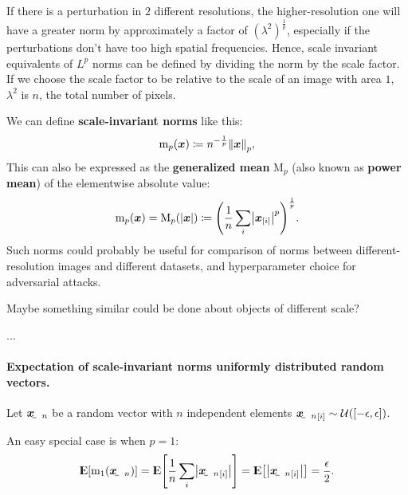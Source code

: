 \documentclass[twocolumn]{article}
\begin{document}
If there is a perturbation in $2$ different resolutions, the higher-resolution one will have a greater norm by approximately a factor of $(\lambda^2)^\frac{1}{p}$, especially if the perturbations don't have too high spatial frequencies. Hence, scale invariant equivalents of $L^p$ norms can be defined by dividing the norm by the scale factor. If we choose the scale factor to be relative to the scale of an image with area $1$, $\lambda^2$ is $n$, the total number of pixels. 

We can define \textbf{scale-invariant norms} like this:
\begin{align}
    \mathrm{m}_p(\vec x) \coloneqq n^{-\frac{1}{p}}\enVert{\vec x}_p, \label{eq:scale-invariant-norm}
\end{align}
This can also be expressed as the \textbf{generalized mean} $\mathrm{M}_p$ (also known as \textbf{power mean}) of the elementwise absolute value:
\begin{align}
    \mathrm{m}_p(\vec x) = \mathrm{M}_p(\envert{\vec x}) \coloneqq \del{\frac{1}{n}\sum_i  \envert{\vec x_\ind{i}}^p}^{\frac{1}{p}}. \label{eq:generalized-mean}
\end{align}
Such norms could probably be useful for comparison of norms between different-resolution images and different datasets, and hyperparameter choice for adversarial attacks.

Maybe something similar could be done about objects of different scale?

...

\paragraph{Expectation of scale-invariant norms uniformly distributed random vectors.}
Let $\rvec x_n$ be a random vector with $n$ independent elements ${\rvec x_n}_\ind{i}\sim\mathcal{U}\del{\intcc{-\epsilon,\epsilon}}$.

An easy special case is when $p=1$:
\begin{align*}
    \E\sbr{\mathrm{m}_1(\rvec x_n)}
	= \E\sbr{\frac{1}{n}\sum_i \envert{{\rvec x_n}_\ind{i}}}
	= \E\sbr{\envert{{\rvec x_n}_\ind{i}}}  
	= \frac{\epsilon}{2} \text{.}
\end{align*}
\end{document}
